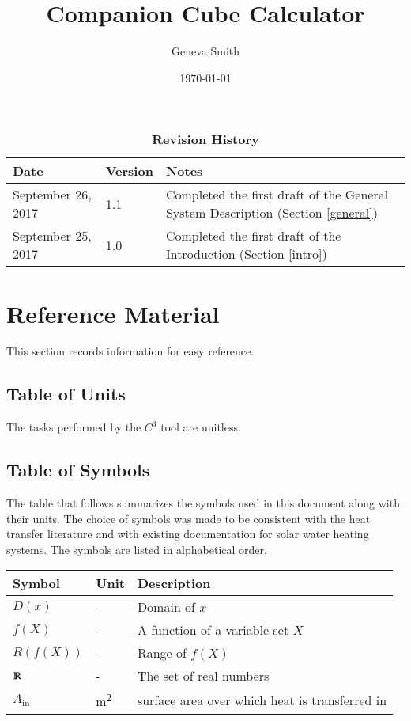 \documentclass[12pt]{article}
\newcommand{\prognameAbbrv}{$C^{3}$}
\begin{document}
\title{Companion Cube Calculator} 
\author{Geneva Smith}
\date{\today}
	
\maketitle

\tableofcontents

\begin{table}[bp]
\caption{\bf Revision History}
\begin{tabularx}{\textwidth}{p{3cm}p{2cm}X}
\toprule {\bf Date} & {\bf Version} & {\bf Notes}\\
\midrule
September 26, 2017 & 1.1 & Completed the first draft of the General System 
Description (Section \ref{general})\\
September 25, 2017 & 1.0 & Completed the first draft of the Introduction 
(Section \ref{intro})\\
\bottomrule
\end{tabularx}
\end{table}

\newpage
\section{Reference Material}

This section records information for easy reference.

\subsection{Table of Units}

The tasks performed by the \prognameAbbrv{} tool are unitless.

\subsection{Table of Symbols}

The table that follows summarizes the symbols used in this document along with
their units.  The choice of symbols was made to be consistent with the heat
transfer literature and with existing documentation for solar water heating
systems.  The symbols are listed in alphabetical order.

\renewcommand{\arraystretch}{1.2}
\noindent \begin{longtable*}{l l p{12cm}} \toprule
\textbf{Symbol} & \textbf{Unit} & \textbf{Description}\\
\midrule 
$D(x)$ & - & Domain of $x$\\
$f(X)$ & - & A function of a variable set $X$\\
$R(f(X))$ & - & Range of $f(X)$\\
$\varmathbb{R}$ & - & The set of real numbers\\
$A_\text{in}$ & \si[per-mode=symbol] {\square\metre} & surface area over 
which heat is transferred in
\\ 
\bottomrule
\end{longtable*}
\end{document}
